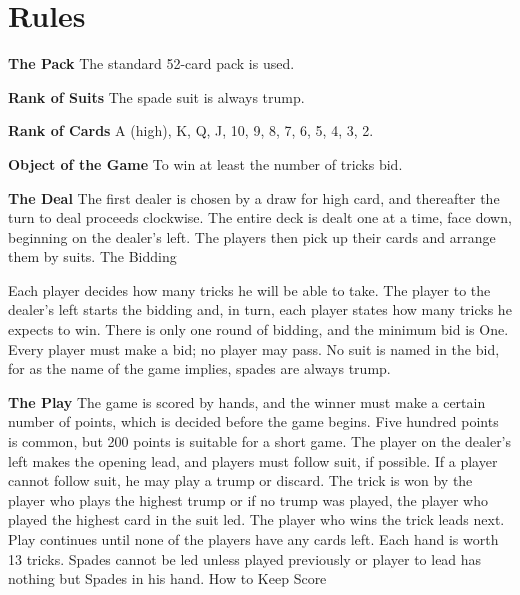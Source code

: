 \section{Rules}
	
\textbf{The Pack} \newline
The standard 52-card pack is used.\newline

\textbf{Rank of Suits} \newline
The spade suit is always trump.\newline

\textbf{Rank of Cards}\newline
A (high), K, Q, J, 10, 9, 8, 7, 6, 5, 4, 3, 2.\newline

\textbf{Object of the Game}\newline
To win at least the number of tricks bid.\newline

\textbf{The Deal} \newline
The first dealer is chosen by a draw for high card, and thereafter the turn to deal proceeds clockwise. The entire deck is dealt one at a time, face down, beginning on the dealer's left. The players then pick up their cards and arrange them by suits.
The Bidding

Each player decides how many tricks he will be able to take. The player to the dealer's left starts the bidding and, in turn, each player states how many tricks he expects to win. There is only one round of bidding, and the minimum bid is One. Every player must make a bid; no player may pass. No suit is named in the bid, for as the name of the game implies, spades are always trump.\newline

\textbf{The Play}\newline
The game is scored by hands, and the winner must make a certain number of points, which is decided before the game begins. Five hundred points is common, but 200 points is suitable for a short game. The player on the dealer's left makes the opening lead, and players must follow suit, if possible. If a player cannot follow suit, he may play a trump or discard. The trick is won by the player who plays the highest trump or if no trump was played, the player who played the highest card in the suit led. The player who wins the trick leads next. Play continues until none of the players have any cards left. Each hand is worth 13 tricks. Spades cannot be led unless played previously or player to lead has nothing but Spades in his hand.
How to Keep Score

